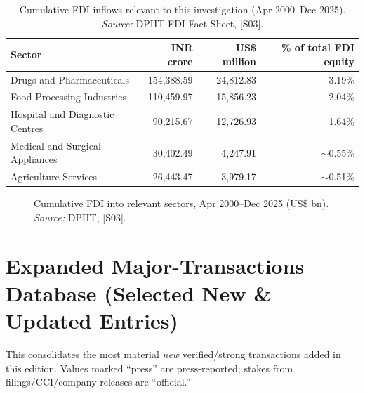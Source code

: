 \documentclass[11pt,a4paper]{article}
\newcommand{\cs}[1]{\textnormal{[#1]}}
\begin{document}
\begin{table}[htbp]
\centering
\small
\caption{Cumulative FDI inflows relevant to this investigation (Apr 2000--Dec 2025). \textit{Source:} DPIIT FDI Fact Sheet, \cs{S03}.}
\label{tab:fdicum}
\begin{tabularx}{\textwidth}{@{}>{\raggedright\arraybackslash}X r r r@{}}
\toprule
\textbf{Sector} & \textbf{INR crore} & \textbf{US\$ million} & \textbf{\% of total FDI equity} \\
\midrule
Drugs and Pharmaceuticals & 154{,}388.59 & 24{,}812.83 & 3.19\% \\
Food Processing Industries & 110{,}459.97 & 15{,}856.23 & 2.04\% \\
Hospital and Diagnostic Centres & 90{,}215.67 & 12{,}726.93 & 1.64\% \\
Medical and Surgical Appliances & 30{,}402.49 & 4{,}247.91 & $\sim$0.55\% \\
Agriculture Services & 26{,}443.47 & 3{,}979.17 & $\sim$0.51\% \\
\bottomrule
\end{tabularx}
\end{table}

\begin{figure}[htbp]
\centering
{}
\caption{Cumulative FDI into relevant sectors, Apr 2000--Dec 2025 (US\$ bn). \textit{Source:} DPIIT, \cs{S03}.}
\label{fig:ch11fdi}
\end{figure}

\section{Expanded Major-Transactions Database (Selected New \& Updated Entries)}\label{sec:transactions}
This consolidates the most material \emph{new} verified/strong transactions added in this edition. Values marked ``press'' are press-reported; stakes from filings/CCI/company releases are ``official.''
\end{document}
